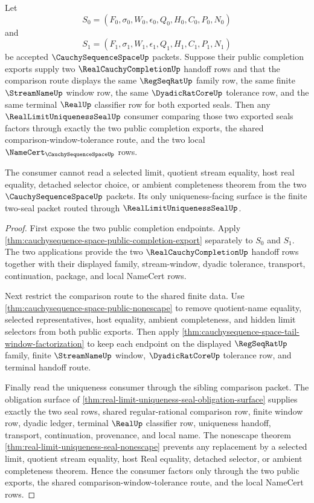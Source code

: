 \begin{theorem}
\label{thm:cauchysequence-space-real-limit-uniqueness-seal-public-consumer}
Let
$$
S_0=(F_0,\sigma_0,W_0,\epsilon_0,Q_0,H_0,C_0,P_0,N_0)
$$
and
$$
S_1=(F_1,\sigma_1,W_1,\epsilon_1,Q_1,H_1,C_1,P_1,N_1)
$$
be accepted $\CauchySequenceSpaceUp$ packets. Suppose their public completion exports supply two $\RealCauchyCompletionUp$ handoff rows and that the comparison route displays the same $\RegSeqRatUp$ family row, the same finite $\StreamNameUp$ window row, the same $\DyadicRatCoreUp$ tolerance row, and the same terminal $\RealUp$ classifier row for both exported seals. Then any $\RealLimitUniquenessSealUp$ consumer comparing those two exported seals factors through exactly the two public completion exports, the shared comparison-window-tolerance route, and the two local $\NameCert_{\CauchySequenceSpaceUp}$ rows.

The consumer cannot read a selected limit, quotient stream equality, host real equality, detached selector choice, or ambient completeness theorem from the two $\CauchySequenceSpaceUp$ packets. Its only uniqueness-facing surface is the finite two-seal packet routed through $\RealLimitUniquenessSealUp$.
\end{theorem}
\begin{proof}
First expose the two public completion endpoints. Apply \autoref{thm:cauchysequence-space-public-completion-export} separately to $S_0$ and $S_1$. The two applications provide the two $\RealCauchyCompletionUp$ handoff rows together with their displayed family, stream-window, dyadic tolerance, transport, continuation, package, and local NameCert rows.

Next restrict the comparison route to the shared finite data. Use \autoref{thm:cauchysequence-space-public-nonescape} to remove quotient-name equality, selected representatives, host equality, ambient completeness, and hidden limit selectors from both public exports. Then apply \autoref{thm:cauchysequence-space-tail-window-factorization} to keep each endpoint on the displayed $\RegSeqRatUp$ family, finite $\StreamNameUp$ window, $\DyadicRatCoreUp$ tolerance row, and terminal handoff route.

Finally read the uniqueness consumer through the sibling comparison packet. The obligation surface of \autoref{thm:real-limit-uniqueness-seal-obligation-surface} supplies exactly the two seal rows, shared regular-rational comparison row, finite window row, dyadic ledger, terminal $\RealUp$ classifier row, uniqueness handoff, transport, continuation, provenance, and local name. The nonescape theorem \autoref{thm:real-limit-uniqueness-seal-nonescape} prevents any replacement by a selected limit, quotient stream equality, host Real equality, detached selector, or ambient completeness theorem. Hence the consumer factors only through the two public exports, the shared comparison-window-tolerance route, and the local NameCert rows.
\end{proof}


